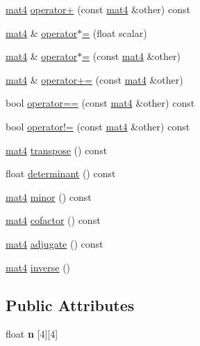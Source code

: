 \begin{DoxyCompactItemize}
\item 
\hyperlink{structmath_1_1mat4}{mat4} \hyperlink{structmath_1_1mat4_a54330fc77b83773e0270c98c3ffb7809}{operator+} (const \hyperlink{structmath_1_1mat4}{mat4} \&other) const
\item 
\hyperlink{structmath_1_1mat4}{mat4} \& \hyperlink{structmath_1_1mat4_a0dff7ff836daf55723f1c7b3c6e2a71f}{operator$\ast$=} (float scalar)
\item 
\hyperlink{structmath_1_1mat4}{mat4} \& \hyperlink{structmath_1_1mat4_af26f144e357f0c2597afe7c0df3f366d}{operator$\ast$=} (const \hyperlink{structmath_1_1mat4}{mat4} \&other)
\item 
\hyperlink{structmath_1_1mat4}{mat4} \& \hyperlink{structmath_1_1mat4_a468b63b10d99f5cff5ab0463a9824eec}{operator+=} (const \hyperlink{structmath_1_1mat4}{mat4} \&other)
\item 
bool \hyperlink{structmath_1_1mat4_a9093d3f340dc10c2f36e6a11eb2de64f}{operator==} (const \hyperlink{structmath_1_1mat4}{mat4} \&other) const
\item 
bool \hyperlink{structmath_1_1mat4_a71a4c93eb519ac123b7347588a1c5377}{operator!=} (const \hyperlink{structmath_1_1mat4}{mat4} \&other) const
\item 
\hyperlink{structmath_1_1mat4}{mat4} \hyperlink{structmath_1_1mat4_a5377071c3eaa45a552c01985babfa169}{transpose} () const
\item 
float \hyperlink{structmath_1_1mat4_a743a3f8bbeda33bae529ef7d5e3d9d0c}{determinant} () const
\item 
\hyperlink{structmath_1_1mat4}{mat4} \hyperlink{structmath_1_1mat4_a6e50d9526b70bdb83ca5c0d4e163db87}{minor} () const
\item 
\hyperlink{structmath_1_1mat4}{mat4} \hyperlink{structmath_1_1mat4_af44ca96fa89e53b4950608b25e2cafe8}{cofactor} () const
\item 
\hyperlink{structmath_1_1mat4}{mat4} \hyperlink{structmath_1_1mat4_acc9c38d9696581fdb745f62ddfeb2f43}{adjugate} () const
\item 
\hyperlink{structmath_1_1mat4}{mat4} \hyperlink{structmath_1_1mat4_a04aa308993896a68a5aac858b41edb7e}{inverse} ()
\end{DoxyCompactItemize}
\subsection*{Public Attributes}
\begin{DoxyCompactItemize}
\item 
\mbox{\label{structmath_1_1mat4_aaff459e45a8ccc31db584ca963df334e}} 
float {\bfseries n} \mbox{[}4\mbox{]}\mbox{[}4\mbox{]}
\end{DoxyCompactItemize}
